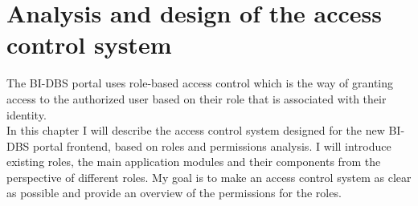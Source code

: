 \chapter{Analysis and design of the access control system}\label{chap3} The BI-DBS portal uses role-based access control which is the way of granting access to the authorized user based on their role  that is associated with their identity. \cite{role-auth}\\ 
In this chapter I will describe the access control system designed for the new BI-DBS portal frontend, based on roles and permissions analysis. I will introduce existing roles, the main application modules and their components from the perspective of different roles. My goal is to make an access control system as clear as possible and provide an overview of the permissions for the roles.







